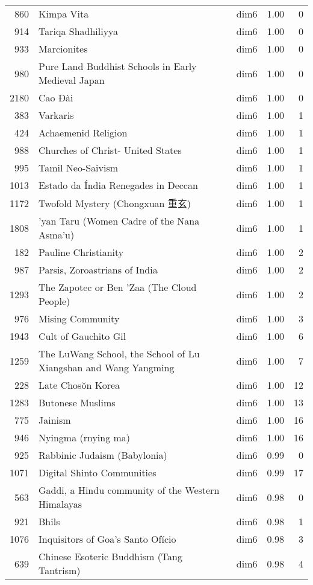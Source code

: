 \begin{tabular}{rllrr}
860 & Kimpa Vita & dim6 & 1.00 & 0 \\
914 & Tariqa Shadhiliyya & dim6 & 1.00 & 0 \\
933 & Marcionites & dim6 & 1.00 & 0 \\
980 & Pure Land Buddhist Schools in Early Medieval Japan & dim6 & 1.00 & 0 \\
2180 & Cao Đài & dim6 & 1.00 & 0 \\
383 & Varkaris & dim6 & 1.00 & 1 \\
424 & Achaemenid Religion & dim6 & 1.00 & 1 \\
988 & Churches of Christ- United States & dim6 & 1.00 & 1 \\
995 & Tamil Neo-Saivism & dim6 & 1.00 & 1 \\
1013 & Estado da Índia Renegades in Deccan & dim6 & 1.00 & 1 \\
1172 & Twofold Mystery (Chongxuan 重玄) & dim6 & 1.00 & 1 \\
1808 & 'yan Taru (Women Cadre of the Nana Asma'u) & dim6 & 1.00 & 1 \\
182 & Pauline Christianity & dim6 & 1.00 & 2 \\
987 & Parsis, Zoroastrians of India & dim6 & 1.00 & 2 \\
1293 & The Zapotec or Ben 'Zaa (The Cloud People) & dim6 & 1.00 & 2 \\
976 & Mising Community & dim6 & 1.00 & 3 \\
1943 & Cult of Gauchito Gil & dim6 & 1.00 & 6 \\
1259 & The LuWang School, the School of Lu Xiangshan and Wang Yangming & dim6 & 1.00 & 7 \\
228 & Late Chosŏn Korea & dim6 & 1.00 & 12 \\
1283 & Butonese Muslims & dim6 & 1.00 & 13 \\
775 & Jainism & dim6 & 1.00 & 16 \\
946 & Nyingma (rnying ma) & dim6 & 1.00 & 16 \\
925 & Rabbinic Judaism (Babylonia) & dim6 & 0.99 & 0 \\
1071 & Digital Shinto Communities & dim6 & 0.99 & 17 \\
563 & Gaddi, a Hindu community of the Western Himalayas & dim6 & 0.98 & 0 \\
921 & Bhils & dim6 & 0.98 & 1 \\
1076 & Inquisitors of Goa's Santo Ofício & dim6 & 0.98 & 3 \\
639 & Chinese Esoteric Buddhism (Tang Tantrism) & dim6 & 0.98 & 4 \\

\end{tabular}
